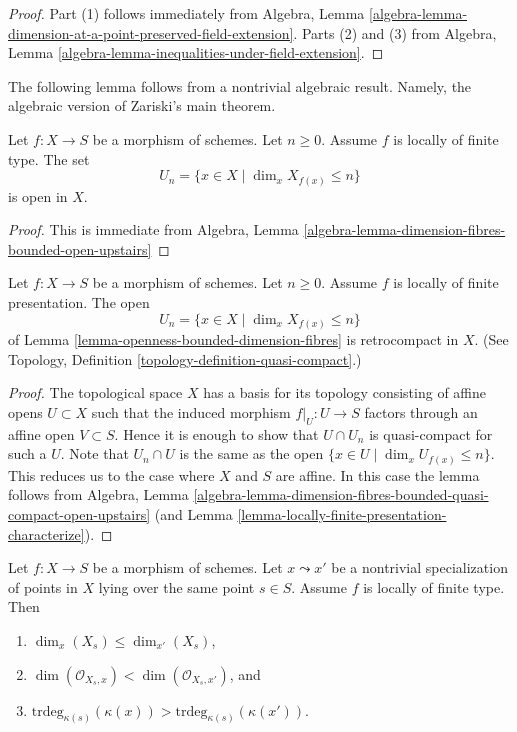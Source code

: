 \begin{proof}
Part (1) follows immediately from
Algebra,
Lemma \ref{algebra-lemma-dimension-at-a-point-preserved-field-extension}.
Parts (2) and (3) from
Algebra, Lemma \ref{algebra-lemma-inequalities-under-field-extension}.
\end{proof}

\noindent
The following lemma follows from a nontrivial algebraic result.
Namely, the algebraic version of Zariski's main theorem.

\begin{lemma}
\label{lemma-openness-bounded-dimension-fibres}
Let $f : X \to S$ be a morphism of schemes.
Let $n \geq 0$. Assume $f$ is locally of finite type.
The set
$$
U_n = \{x \in X \mid \dim_x X_{f(x)} \leq n\}
$$
is open in $X$.
\end{lemma}

\begin{proof}
This is immediate from
Algebra,
Lemma \ref{algebra-lemma-dimension-fibres-bounded-open-upstairs}
\end{proof}

\begin{lemma}
\label{lemma-openness-bounded-dimension-fibres-finite-presentation}
Let $f : X \to S$ be a morphism of schemes.
Let $n \geq 0$. Assume $f$ is locally of finite presentation.
The open
$$
U_n = \{x \in X \mid \dim_x X_{f(x)} \leq n\}
$$
of Lemma \ref{lemma-openness-bounded-dimension-fibres} is retrocompact
in $X$. (See Topology, Definition \ref{topology-definition-quasi-compact}.)
\end{lemma}

\begin{proof}
The topological space $X$ has a basis for its topology consisting of
affine opens $U \subset X$ such that the induced morphism
$f|_U : U \to S$ factors through an affine open $V \subset S$. Hence
it is enough to show that $U \cap U_n$ is quasi-compact for such a $U$.
Note that $U_n \cap U$ is the same as the open
$\{x \in U \mid \dim_x U_{f(x)} \leq n\}$. This reduces us to the case
where $X$ and $S$ are affine. In this case the lemma follows from
Algebra,
Lemma \ref{algebra-lemma-dimension-fibres-bounded-quasi-compact-open-upstairs}
(and Lemma \ref{lemma-locally-finite-presentation-characterize}).
\end{proof}

\begin{lemma}
\label{lemma-dimension-fibre-specialization}
Let $f : X \to S$ be a morphism of schemes.
Let $x \leadsto x'$ be a nontrivial specialization of points in $X$
lying over the same point $s \in S$. Assume $f$ is locally of finite type.
Then
\begin{enumerate}
\item $\dim_x(X_s) \leq \dim_{x'}(X_s)$,
\item $\dim(\mathcal{O}_{X_s, x}) < \dim(\mathcal{O}_{X_s, x'})$, and
\item $\text{trdeg}_{\kappa(s)}(\kappa(x)) >
\text{trdeg}_{\kappa(s)}(\kappa(x'))$.
\end{enumerate}
\end{lemma}

